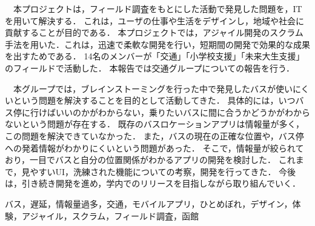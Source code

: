 \documentclass[openany,11pt,papersize,dvipdfm]{jsbook}
\begin{document}
\maketitle

\frontmatter

\begin{jabstract}
　本プロジェクトは，フィールド調査をもとにした活動で発見した問題を，ITを用いて解決する．
これは，ユーザの仕事や生活をデザインし，地域や社会に貢献することが目的である．
本プロジェクトでは，アジャイル開発のスクラム手法を用いた．これは，迅速で柔軟な開発を行い，短期間の開発で効果的な成果を出すためである．
14名のメンバーが「交通」「小学校支援」「未来大生支援」のフィールドで活動した．
本報告では交通グループについての報告を行う．

　本グループでは，ブレインストーミングを行った中で発見したバスが使いにくいという問題を解決することを目的として活動してきた．
具体的には，いつバス停に行けばいいのかがわからない，乗りたいバスに間に合うかどうかがわからないという問題が存在する．
既存のバスロケーションアプリは情報量が多く，この問題を解決できていなかった．
また，バスの現在の正確な位置や，バス停への発着情報がわかりにくいという問題があった．
そこで，情報量が絞られており，一目でバスと自分の位置関係がわかるアプリの開発を検討した．
これまで，見やすいUI，洗練された機能についての考察，開発を行ってきた．
今後は，引き続き開発を進め，学内でのリリースを目指しながら取り組んでいく．

\begin{jkeyword}
バス，遅延，情報量過多，交通，モバイルアプリ，ひとめぼれ，デザイン，体験，アジャイル，スクラム，フィールド調査，函館
\end{jkeyword}
\end{jabstract}
\end{document}
